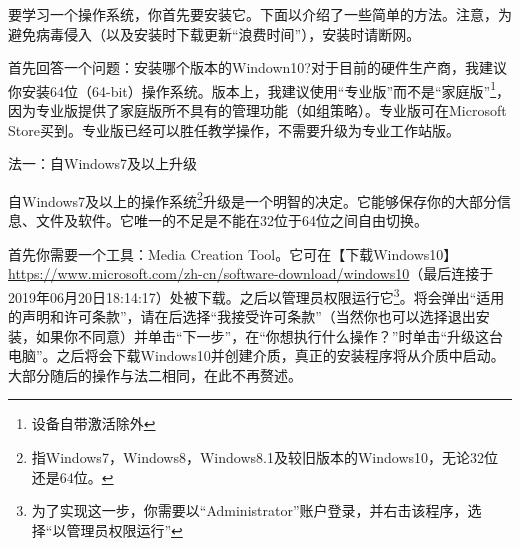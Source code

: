\documentclass{book}
\begin{document}
\begin{window}
要学习一个操作系统，你首先要安装它。下面以介绍了一些简单的方法。注意，为避免病毒侵入（以及安装时下载更新“浪费时间”），安装时请断网。\par
首先回答一个问题：安装哪个版本的Windown10?对于目前的硬件生产商，我建议你安装64位（64-bit）操作系统。版本上，我建议使用“专业版”而不是“家庭版”\footnote{设备自带激活除外}，因为专业版提供了家庭版所不具有的管理功能（如组策略）。专业版可在Microsoft Store买到。专业版已经可以胜任教学操作，不需要升级为专业工作站版。\par
\end{window}
法一：自Windows7及以上升级\par
自Windows7及以上的操作系统\footnote{指Windows7，Windows8，Windows8.1及较旧版本的Windows10，无论32位还是64位。}升级是一个明智的决定。它能够保存你的大部分信息、文件及软件。它唯一的不足是不能在32位于64位之间自由切换。\par
首先你需要一个工具：Media Creation Tool。它可在【下载Windows10】\url{https://www.microsoft.com/zh-cn/software-download/windows10}（最后连接于2019年06月20日18:14:17）处被下载。之后以管理员权限运行它\footnote{为了实现这一步，你需要以“Administrator”账户登录，并右击该程序，选择“以管理员权限运行”}。将会弹出“适用的声明和许可条款”，请在{\color{red}{仔细阅读}}后选择“我接受许可条款”（当然你也可以选择退出安装，如果你不同意）并单击“下一步”，在“你想执行什么操作？”时单击“升级这台电脑”。之后将会下载Windows10并创建介质，真正的安装程序将从介质中启动。大部分随后的操作与法二相同，在此不再赘述。\par
\end{document}
